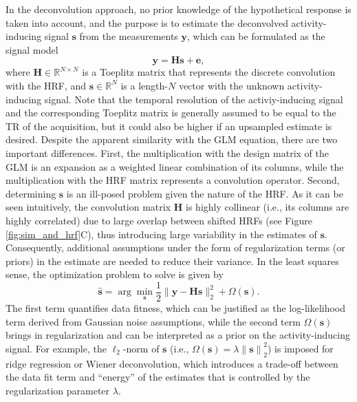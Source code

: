 In the deconvolution approach, no prior knowledge of the hypothetical response is taken into account, and the purpose is to estimate the deconvolved activity-inducing signal $\mathbf{s}$ from the measurements $\mathbf{y}$, which can be formulated as the signal model
\begin{equation}
    \label{eq:synthesis_model}
    \mathbf{y} = \mathbf{Hs} + \mathbf{e},
\end{equation}
where $\mathbf{H} \in \mathbb{R}^{N \times N}$ is a Toeplitz matrix that represents the discrete convolution with the HRF, and $\mathbf{s} \in \mathbb{R}^{N}$ is a length-$N$ vector with the unknown activity-inducing signal. Note that the temporal resolution of the activiy-inducing signal and the corresponding Toeplitz matrix is generally assumed to be equal to the TR of the acquisition, but it could also be higher if an upsampled estimate is desired. Despite the apparent similarity with the GLM equation, there are two important differences. First, the multiplication with the design matrix of the GLM is an expansion as a weighted linear combination of its columns, while the multiplication with the HRF matrix represents a convolution operator. Second, determining $\mathbf{s}$ is an ill-posed problem given the nature of the HRF. As it can be seen intuitively, the convolution matrix $\mathbf{H}$ is highly collinear (i.e., its columns are highly correlated) due to large overlap between shifted HRFs (see Figure \ref{fig:sim_and_hrf}C), thus introducing large variability in the estimates of $\mathbf{s}$. Consequently, additional assumptions under the form of regularization terms (or priors) in the estimate are needed to reduce their variance. In the least squares sense, the optimization problem to solve is given by 
\begin{equation}
    \label{eq:regularized_least_squares}
    \hat{\mathbf{s}} = \arg \min_{\mathbf{s}} \frac{1}{2} \| \mathbf{y} - \mathbf{Hs} \|_2^2 + \Omega(\mathbf{s}).
\end{equation}
The first term quantifies data fitness, which can be justified as the log-likelihood term derived from Gaussian noise assumptions, while the second term \(\Omega(\mathbf{s})\) brings in regularization and can be interpreted as a prior on the activity-inducing signal. For example, the $\ell_2$-norm of $\mathbf{s}$ (i.e., $\Omega(\mathbf{s})=\lambda \left\| \mathbf{s}\right\|_2^2$) is imposed for ridge regression or Wiener deconvolution, which introduces a trade-off between the data fit term and ``energy'' of the estimates that is controlled by the regularization parameter $\lambda$. %

